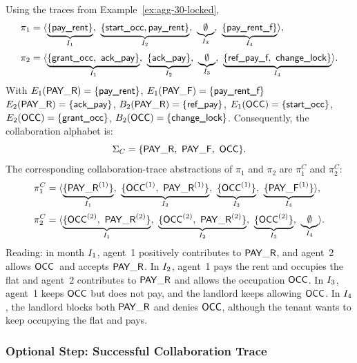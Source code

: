 \begin{example}\label{ex:collab}
Using the traces from Example~\ref{ex:agg-30-locked},
\[
\begin{aligned}
\pi_1&=\trace{%
\underbrace{\{\textsf{pay\_rent}\}}_{\Ik{1}},\ 
\underbrace{\{\textsf{start\_occ}, \textsf{pay\_rent} \}}_{\Ik{2}},\ 
\underbrace{\emptyset}_{\Ik{3}},\ 
\underbrace{\{\textsf{pay\_rent\_f}\}}_{\Ik{4}}
},\\[2pt]
\pi_2&=\trace{%
\underbrace{\{\textsf{grant\_occ},\ \textsf{ack\_pay}\}}_{\Ik{1}},\ 
\underbrace{\{\textsf{ack\_pay}\}}_{\Ik{2}},\ 
\underbrace{\emptyset}_{\Ik{3}},\ 
\underbrace{\{\textsf{ref\_pay\_f},\ \textsf{change\_lock}\}}_{\Ik{4}}
}.
\end{aligned}
\]
With \(E_1(\mathsf{PAY\_R})=\{\textsf{pay\_rent}\}\), \(E_1(\mathsf{PAY\_F})=\{\textsf{pay\_rent\_f}\}\)
\(E_2(\mathsf{PAY\_R})=\{\textsf{ack\_pay}\}\),
\(B_2(\mathsf{PAY\_R})=\{\textsf{ref\_pay}\}\),
\(E_1(\mathsf{OCC})=\{\textsf{start\_occ}\}\),
\(E_2(\mathsf{OCC})=\{\textsf{grant\_occ}\}\),
\(B_2(\mathsf{OCC})=\{\textsf{change\_lock}\}\).
Consequently, the collaboration alphabet is:
\[
\Sigma_C=\{\mathsf{PAY\_R},\ \mathsf{PAY\_F},\ \mathsf{OCC}\}.
\]
The corresponding collaboration-trace abstractions of $\pi_1$ and $\pi_2$ are $\pi_1^C$ and $\pi_2^C$:
\[
\begin{aligned}
\pi_1^{C}&=\trace{%
\underbrace{\{\pay{1}\}}_{\Ik{1}},\ 
\underbrace{\{\occ{1},\ \pay{1}\}}_{\Ik{2}},\ 
\underbrace{\{\occ{1}\}}_{\Ik{3}},\ 
\underbrace{\{\payf{1}\}}_{\Ik{4}}
},\\[2pt]
\pi_2^{C}&=\trace{%
\underbrace{\{\occ{2},\ \pay{2}\}}_{\Ik{1}},\ 
\underbrace{\{\occ{2},\ \pay{2}\}}_{\Ik{2}},\ 
\underbrace{\{\occ{2}\}}_{\Ik{3}},\ 
\underbrace{\emptyset}_{\Ik{4}}
}.
\end{aligned}
\]
Reading: in month \(I_{1}\), agent~1 positively contributes to $\mathsf{PAY\_R}$, and agent~2 allows $\mathsf{OCC}$\ and accepts $\mathsf{PAY\_R}$.
In \(I_{2}\), agent~1 pays the rent and occupies the flat and agent~2 contributes to $\mathsf{PAY\_R}$ and allows the occupation $\mathsf{OCC}$. In \(I_{3}\), agent~1 keeps $\mathsf{OCC}$ but does not pay, and the landlord keeps allowing $\mathsf{OCC}$. In \(I_{4}\), the landlord blocks both $\mathsf{PAY\_R}$ and denies $\mathsf{OCC}$, although the tenant wants to keep occupying the flat and pays.
\end{example}

  
  
  \subsubsection{Optional Step: Successful Collaboration Trace}
   
